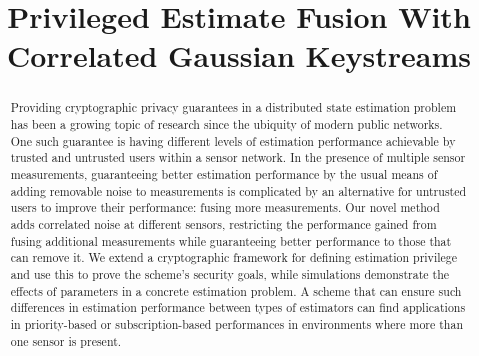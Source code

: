 \documentclass[conference]{IEEEtran}
\theoremstyle{definition}
\theoremstyle{remark}
\begin{document}
\title{Privileged Estimate Fusion With Correlated Gaussian Keystreams}

\author{
\and
{}
}

\maketitle

% 
%                                    
%                                    
%                                    
% 

\begin{abstract}
Providing cryptographic privacy guarantees in a distributed state estimation problem has been a growing topic of research since the ubiquity of modern public networks. One such guarantee is having different levels of estimation performance achievable by trusted and untrusted users within a sensor network. In the presence of multiple sensor measurements, guaranteeing better estimation performance by the usual means of adding removable noise to measurements is complicated by an alternative for untrusted users to improve their performance: fusing more measurements. Our novel method adds correlated noise at different sensors, restricting the performance gained from fusing additional measurements while guaranteeing better performance to those that can remove it. We extend a cryptographic framework for defining estimation privilege and use this to prove the scheme's security goals, while simulations demonstrate the effects of parameters in a concrete estimation problem. A scheme that can ensure such differences in estimation performance between types of estimators can find applications in priority-based or subscription-based performances in environments where more than one sensor is present.
\end{abstract}
\end{document}
